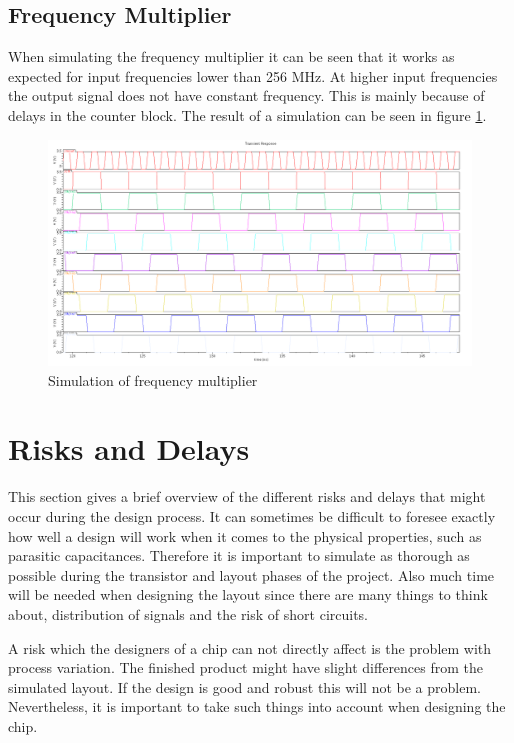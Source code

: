 \documentclass[a4paper,12pt]{article} \usepackage{graphicx}
\begin{document}
\subsection{Frequency Multiplier}
When simulating the frequency multiplier it can be seen that it works
as expected for input frequencies lower than 256 MHz. At higher input 
frequencies the output signal does not have constant frequency. This is
mainly because of delays in the counter block.
The result of a simulation can be seen in figure \ref{fig:freq_mult_sim}.
\begin{figure}[hb]
        \centering
        \includegraphics[width=\textwidth]{../Bilder/delay_line_sim.png}
        \caption{Simulation of frequency multiplier}
        \label{fig:freq_mult_sim}
\end{figure}

\section{Risks and Delays}
This section gives a brief overview of the different risks and delays
that might occur during the design process. It can sometimes be
difficult to foresee exactly how well a design will work when it comes
to the physical properties, such as parasitic capacitances. Therefore
it is important to simulate as thorough as possible during the
transistor and layout phases of the project. Also much time will be
needed when designing the layout since there are many things to think
about, distribution of signals and the risk of short circuits. 

A risk which the designers of a chip can not directly affect is the
problem with process variation. The finished product might have slight
differences from the simulated layout. If the design is good and
robust this will not be a problem. Nevertheless, it is important to
take such things into account when designing the chip.
\end{document}
